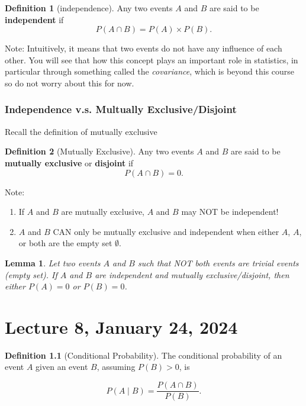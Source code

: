 \documentclass[
]{book}
\newtheorem{lemma}{Lemma}[chapter]
\theoremstyle{definition}
\newtheorem{definition}{Definition}[chapter]
\theoremstyle{definition}
\theoremstyle{definition}
\theoremstyle{definition}
\theoremstyle{remark}
\begin{document}
\begin{definition}[independence]
Any two events \(A\) and \(B\) are said to be \textbf{independent} if
\[
  P(A \cap B) = P(A)\times P(B).
\]
\end{definition}

Note: Intuitively, it means that two events do not have any influence of each other. You will see that how this concept plays an important role in statistics, in particular through something called the \emph{covariance}, which is beyond this course so do not worry about this for now.

\hypertarget{independence-v.s.-multually-exclusivedisjoint}{%
\subsection{Independence v.s. Multually Exclusive/Disjoint}\label{independence-v.s.-multually-exclusivedisjoint}}

Recall the definition of mutually exclusive

\begin{definition}[Mutually Exclusive]
Any two events \(A\) and \(B\) are said to be \textbf{mutually exclusive} or \textbf{disjoint} if
\[
  P(A \cap B) = 0.
\]
\end{definition}

Note:

\begin{enumerate}
\def\labelenumi{\arabic{enumi}.}
\item
  If \(A\) and \(B\) are mutually exclusive, \(A\) and \(B\) may NOT be independent!
\item
  \(A\) and \(B\) CAN only be mutually exclusive and independent when either \(A\), \(A\), or both are the empty set \(\emptyset\).
\end{enumerate}

\begin{lemma}
Let two events \(A\) and \(B\) such that NOT both events are trivial events (empty set). If \(A\) and \(B\) are independent and mutually exclusive/disjoint, then either \(P(A) = 0\) or \(P(B) = 0\).
\end{lemma}

\hypertarget{lecture-8-january-24-2024}{%
\chapter{Lecture 8, January 24, 2024}\label{lecture-8-january-24-2024}}

\begin{definition}[Conditional Probability]
The conditional probability of an event \(A\) given an event \(B\), assuming \(P(B)>0\), is

\[
  P(A \mid B) = \frac{P(A\cap B)}{P(B)}.
\]
\end{definition}
\end{document}
